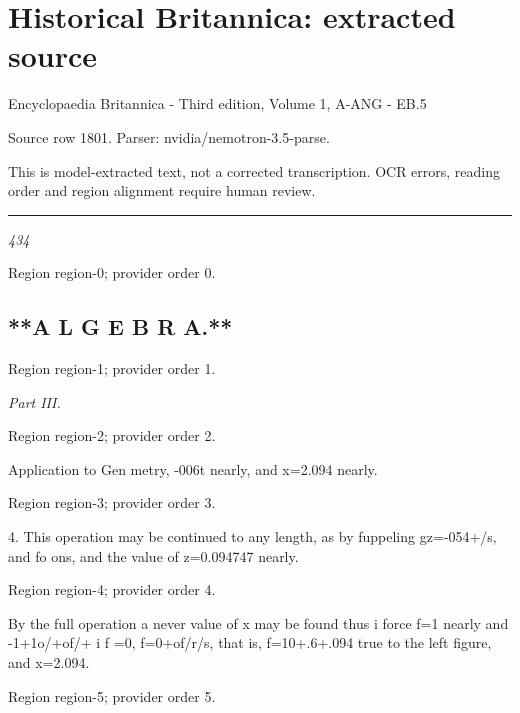 \documentclass[11pt]{article}
\begin{document}
\section*{Historical Britannica: extracted source}
Encyclopaedia Britannica - Third edition, Volume 1, A-ANG - EB.5\par
{\small Source row 1801. Parser: nvidia/nemotron-3.5-parse.\par}
{\small This is model-extracted text, not a corrected transcription. OCR errors, reading order and region alignment require human review.\par}
\hrule\medskip
{\small\itshape 434\par}

{\scriptsize\color{gray} Region region-0; provider order 0.\par}
\medskip

\subsection*{**A L G E B R A.**}

{\scriptsize\color{gray} Region region-1; provider order 1.\par}
\medskip

{\small\itshape Part III.\par}

{\scriptsize\color{gray} Region region-2; provider order 2.\par}
\medskip

Application
to Gen
metry,
-006t nearly, and x=2.094 nearly.
\par

{\scriptsize\color{gray} Region region-3; provider order 3.\par}
\medskip

4. This operation may be continued to any length,
as by fuppeling gz=-054+/s, and fo ons, and the
value of z=0.094747 nearly.
\par

{\scriptsize\color{gray} Region region-4; provider order 4.\par}
\medskip

By the full operation a never value of x may be
found thus i force f=1 nearly and -1+1o/+of/+
i
f =0, f=0+of/r/s, that is, f=10+.6+.094
true to the left figure, and x=2.094.
\par

{\scriptsize\color{gray} Region region-5; provider order 5.\par}
\medskip
\end{document}
